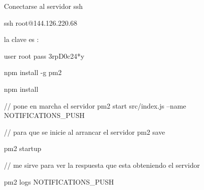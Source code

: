Conectarse al servidor ssh

ssh root@144.126.220.68

la clave es : 

user root
pass 3rpD0c24*y


npm install -g pm2


npm install


// pone en marcha el servidor
pm2 start src/index.js --name NOTIFICATIONS_PUSH


// para que se inicie al arrancar el servidor
pm2 save


pm2 startup

// me sirve para ver la respuesta que esta obteniendo el servidor 

pm2 logs NOTIFICATIONS_PUSH 

